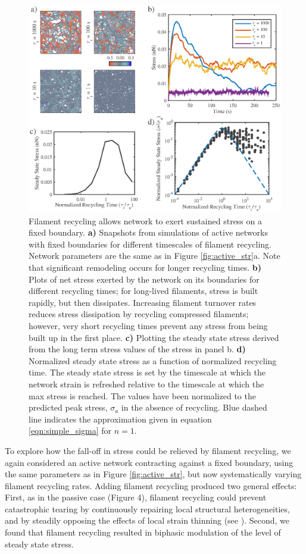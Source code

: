 \documentclass[10pt,letterpaper]{article}
\begin{document}
\begin{figure}[h!]
	\centering
	\includegraphics[width=\hsize]{figures/figure7}
	\caption{\label{fig:active_rec} Filament recycling allows network to exert sustained stress on a fixed boundary. \textbf{a)} Snapshots from simulations of active networks with fixed boundaries for different timescales of filament recycling.  Network parameters are the same as in Figure \ref{fig:active_str}a. Note that significant remodeling occurs for longer recycling times. \textbf{b)} Plots of net stress exerted by the network on its boundaries for different recycling times; for long-lived filaments, stress is built rapidly, but then dissipates. Increasing filament turnover rates reduces stress dissipation by recycling compressed filaments; however, very short recycling times prevent any stress from being built up in the first place. \textbf{c)} Plotting the steady state stress derived from the long term stress values of the stress in panel b.  \textbf{d)} Normalized steady state stress as a function of normalized recycling time. The steady state stress is set by the timescale at which the network strain is refreshed relative to the timescale at which the max stress is reached. The values have been normalized to the predicted peak stress, $\sigma_a$ in the absence of recycling. Blue dashed line indicates the approximation given in equation \ref{eqn:simple_sigma} for $n=1$.}
\end{figure}

To explore how the fall-off in stress could be relieved by filament recycling, we again considered an active network contracting against a fixed boundary, using the same parameters as in Figure \ref{fig:active_str}, but now systematically varying filament recycling rates. Adding filament recycling produced two general effects: First, as in the passive case (Figure 4), filament recycling could prevent catastrophic tearing by continuously repairing local structural heterogeneities, and by steadily opposing the effects of local strain thinning (see ). Second, we found that filament recycling resulted in biphasic modulation of the level of steady state stress.
\end{document}

